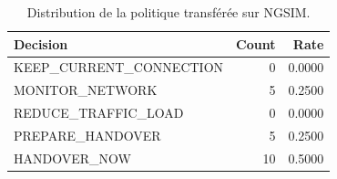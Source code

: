 \begin{table}[!htbp]
\caption{Distribution de la politique transférée sur NGSIM.}
\label{tab:external_reference_distribution}
\begin{tabular}{lrr}
\toprule
Decision & Count & Rate \\
\midrule
KEEP\_CURRENT\_CONNECTION & 0 & 0.0000 \\
MONITOR\_NETWORK & 5 & 0.2500 \\
REDUCE\_TRAFFIC\_LOAD & 0 & 0.0000 \\
PREPARE\_HANDOVER & 5 & 0.2500 \\
HANDOVER\_NOW & 10 & 0.5000 \\
\bottomrule
\end{tabular}
\end{table}
